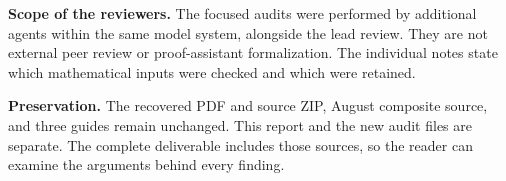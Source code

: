 \textbf{Scope of the reviewers.}
The focused audits were performed by additional agents within the
same model system, alongside the lead review. They are not external
peer review or proof-assistant formalization. The individual notes
state which mathematical inputs were checked and which were retained.

\textbf{Preservation.}
The recovered PDF and source ZIP, August composite source, and
three guides remain unchanged. This report and the new audit files
are separate. The complete deliverable includes those sources, so
the reader can examine the arguments behind every finding.


